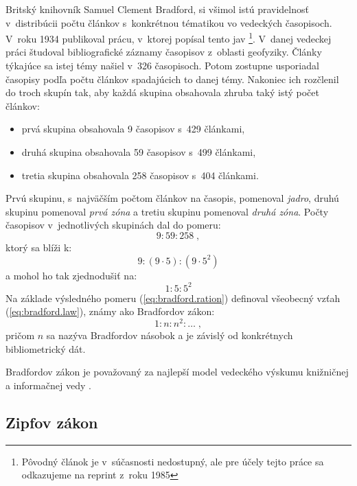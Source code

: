 Britský knihovník Samuel Clement Bradford, si všimol istú pravidelnosť
v~distribúcii počtu článkov s~konkrétnou tématikou vo vedeckých časopisoch.
V~roku 1934 publikoval prácu, v~ktorej popísal tento jav
\citep{Bradford1985}\footnote{Pôvodný článok je v~súčasnosti nedostupný, ale
pre účely tejto práce sa odkazujeme na reprint z~roku 1985}.  V~danej vedeckej
práci študoval bibliografické záznamy časopisov z~oblasti geofyziky.  Články
týkajúce sa istej témy našiel v~326 časopisoch.  Potom zostupne usporiadal
časopisy podľa počtu článkov spadajúcich to danej témy.  Nakoniec ich rozčlenil
do troch skupín tak, aby každá skupina obsahovala zhruba taký istý počet
článkov:

\begin{itemize}
\item prvá skupina obsahovala 9 časopisov s~429 článkami,
\item druhá skupina obsahovala 59 časopisov s~499 článkami,
\item tretia skupina obsahovala 258 časopisov s~404 článkami.
\end{itemize}
Prvú skupinu, s~najväčším počtom článkov na časopis, pomenoval \emph{jadro},
druhú skupinu pomenoval \emph{prvá zóna} a tretiu skupinu pomenoval \emph{druhá
  zóna}.  Počty časopisov v~jednotlivých skupinách dal do pomeru:
\begin{equation*}
9 : 59 : 258 \;,
\end{equation*}
ktorý sa blíži k:
\begin{equation*}
9 : (9 \cdot 5) : (9 \cdot 5^2)
\end{equation*}
a mohol ho tak zjednodušiť na:
\begin{equation}
\label{eq:bradford.ration}
1 : 5 : 5^2
\end{equation}
Na základe výsledného pomeru (\ref{eq:bradford.ration}) definoval všeobecný
vzťah (\ref{eq:bradford.law}), známy ako Bradfordov zákon:
\begin{equation}
\label{eq:bradford.law}
1 : n : n^2 : \dotso \;,
\end{equation}
pričom $n$ sa nazýva Bradfordov násobok a je závislý od konkrétnych
bibliometrický dát.

Bradfordov zákon je považovaný za najlepší model vedeckého výskumu knižničnej a
informačnej vedy \citep[napr.][]{Nicolaisen2007}.


\subsection{Zipfov zákon}

